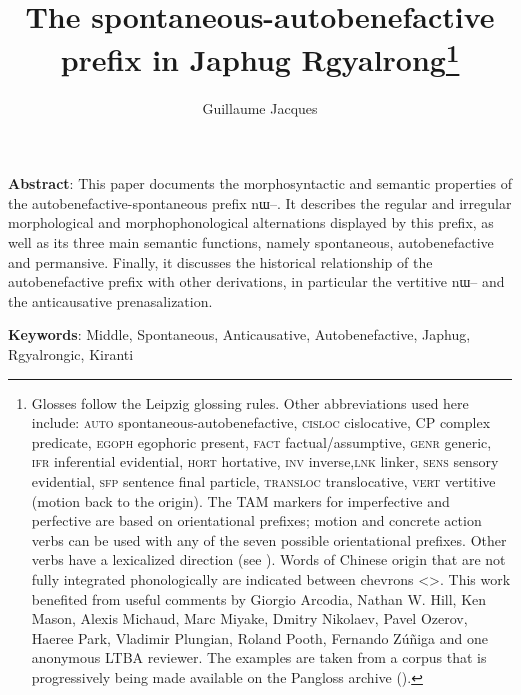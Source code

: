 \documentclass[oldfontcommands,oneside,a4paper,11pt]{article}
\newcommand{\ipa}[1]{{\phon \mbox{#1}}} %
\begin{document}
 
 \title{The spontaneous-autobenefactive prefix in Japhug Rgyalrong\footnote{Glosses follow the Leipzig glossing rules. Other abbreviations used here include: \textsc{auto} spontaneous-autobenefactive, \textsc{cisloc} cislocative, CP complex predicate, \textsc{egoph} egophoric present,  \textsc{fact} factual/assumptive, \textsc{genr} generic, \textsc{ifr} inferential evidential, \textsc{hort} hortative, \textsc{inv} inverse,\textsc{lnk} linker, \textsc{sens} sensory  evidential, \textsc{sfp} sentence final particle, \textsc{transloc} translocative, \textsc{vert} vertitive (motion back to the origin). The TAM markers for imperfective and perfective are based on orientational prefixes; motion and concrete action verbs can be used with any of the seven possible orientational prefixes. Other verbs have a lexicalized direction (see \citealt[266-270]{jacques14linking}).  Words of Chinese origin that are not fully integrated phonologically are indicated between chevrons <>.   This work benefited from useful comments by Giorgio  Arcodia, Nathan W. Hill, Ken Mason, Alexis Michaud, Marc Miyake, Dmitry Nikolaev, Pavel Ozerov, Haeree Park, Vladimir Plungian, Roland Pooth, Fernando Zúñiga and one anonymous LTBA reviewer. The examples are taken from a corpus that is progressively being made available on the Pangloss archive (\citealt{michailovsky14pangloss}). }}
\author{Guillaume Jacques}
\maketitle
\sloppy

\textbf{Abstract}: This paper documents the morphosyntactic and semantic properties of the autobenefactive-spontaneous prefix \ipa{nɯ--}. It describes the regular and irregular morphological and morphophonological alternations displayed by this prefix, as well as its three main semantic functions, namely spontaneous, autobenefactive and permansive. Finally, it discusses the historical relationship of the autobenefactive prefix with other derivations, in particular the vertitive \ipa{nɯ--} and the anticausative prenasalization.

\textbf{Keywords}: Middle, Spontaneous, Anticausative, Autobenefactive, Japhug, Rgyalrongic, Kiranti
\end{document}
